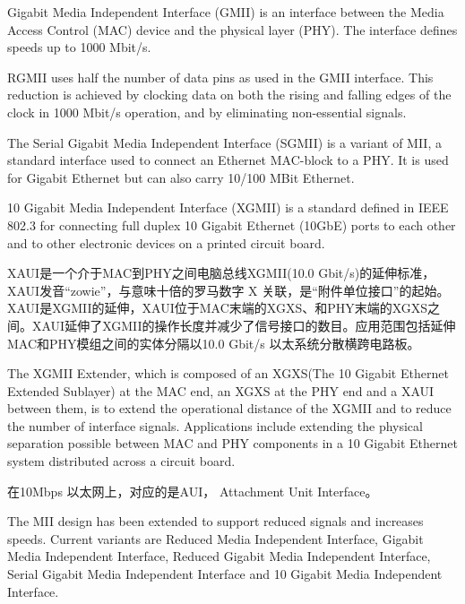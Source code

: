Gigabit Media Independent Interface (GMII) is an interface between the Media Access Control (MAC) device and the physical layer (PHY). The interface defines speeds up to 1000 Mbit/s.

RGMII uses half the number of data pins as used in the GMII interface. This reduction is achieved by clocking data on both the rising and falling edges of the clock in 1000 Mbit/s operation, and by eliminating non-essential signals.

The Serial Gigabit Media Independent Interface (SGMII) is a variant of MII, a standard interface used to connect an Ethernet MAC-block to a PHY. It is used for Gigabit Ethernet but can also carry 10/100 MBit Ethernet.

10 Gigabit Media Independent Interface (XGMII) is a standard defined in IEEE 802.3 for connecting full duplex 10 Gigabit Ethernet (10GbE) ports to each other and to other electronic devices on a printed circuit board.

XAUI是一个介于MAC到PHY之间电脑总线XGMII(10.0 Gbit/s)的延伸标准，XAUI发音``zowie''，与意味十倍的罗马数字 X 关联，是“附件单位接口”的起始。
XAUI是XGMII的延伸，XAUI位于MAC末端的XGXS、和PHY末端的XGXS之间。XAUI延伸了XGMII的操作长度并减少了信号接口的数目。应用范围包括延伸MAC和PHY模组之间的实体分隔以10.0 Gbit/s 以太系统分散横跨电路板。

The XGMII Extender, which is composed of an XGXS(The 10 Gigabit Ethernet Extended Sublayer) at the MAC end, an XGXS at the PHY end and a XAUI between them, is to extend the operational distance of the XGMII and to reduce the number of interface signals. Applications include extending the physical separation possible between MAC and PHY components in a 10 Gigabit Ethernet system distributed across a circuit board.


在10Mbps 以太网上，对应的是AUI， Attachment Unit Interface。

The MII design has been extended to support reduced signals and increases speeds. Current variants are Reduced Media Independent Interface, Gigabit Media Independent Interface, Reduced Gigabit Media Independent Interface, Serial Gigabit Media Independent Interface and 10 Gigabit Media Independent Interface.


























